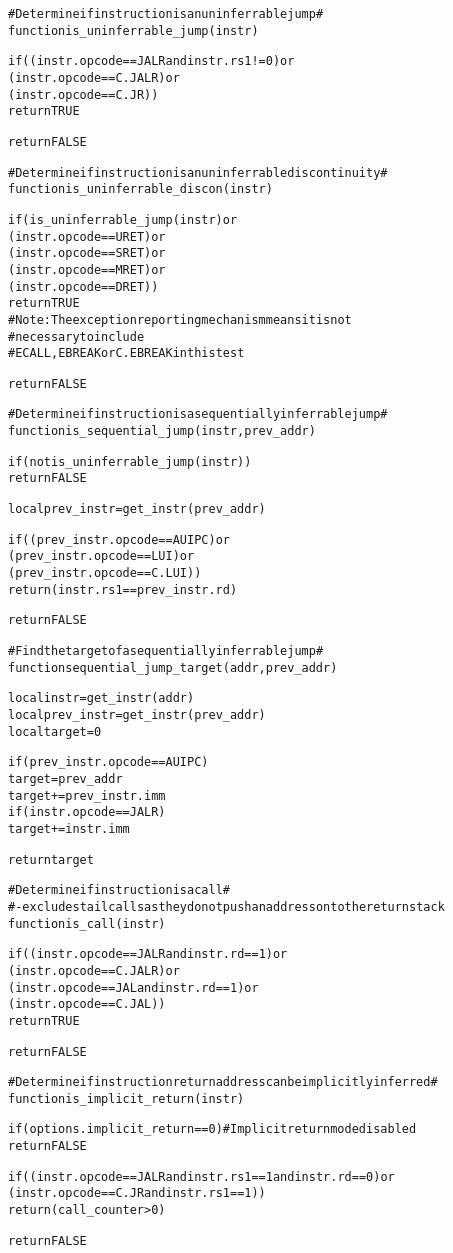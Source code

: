 \pagebreak

\begin{alltt}
# Determine if instruction is an uninferrable jump #
function is_uninferrable_jump (instr)

  if ((instr.opcode == JALR and instr.rs1 != 0) or
      (instr.opcode == C.JALR)                  or
      (instr.opcode == C.JR))
    return TRUE

  return FALSE

# Determine if instruction is an uninferrable discontinuity #
function is_uninferrable_discon (instr)

  if (is_uninferrable_jump(instr) or
      (instr.opcode == URET)      or
      (instr.opcode == SRET)      or
      (instr.opcode == MRET)      or
      (instr.opcode == DRET))
    return TRUE
    # Note: The exception reporting mechanism means it is not
    #   necessary to include
    # ECALL, EBREAK or C.EBREAK in this test

  return FALSE

# Determine if instruction is a sequentially inferrable jump #
function is_sequential_jump (instr, prev_addr)

  if (not is_uninferrable_jump(instr))
    return FALSE

  local prev_instr = get_instr(prev_addr)

  if((prev_instr.opcode == AUIPC) or
     (prev_instr.opcode == LUI)   or
     (prev_instr.opcode == C.LUI))
    return (instr.rs1 == prev_instr.rd)

  return FALSE
\end{alltt}

\pagebreak

\begin{alltt}
# Find the target of a sequentially inferrable jump #
function sequential_jump_target (addr, prev_addr)

  local instr      = get_instr(addr)
  local prev_instr = get_instr(prev_addr)
  local target     = 0

  if (prev_instr.opcode == AUIPC)
    target = prev_addr
  target += prev_instr.imm
  if (instr.opcode == JALR)
    target += instr.imm

  return target

# Determine if instruction is a call #
# - excludes tail calls as they do not push an address onto the return stack
function is_call (instr)

  if ((instr.opcode == JALR and instr.rd == 1) or
      (instr.opcode == C.JALR)                 or
      (instr.opcode == JAL  and instr.rd == 1) or
      (instr.opcode == C.JAL))
    return TRUE

  return FALSE

# Determine if instruction return address can be implicitly inferred #
function is_implicit_return (instr)

  if (options.implicit_return == 0) # Implicit return mode disabled
    return FALSE

  if ((instr.opcode == JALR and instr.rs1 == 1 and instr.rd == 0) or
      (instr.opcode == C.JR and instr.rs1 == 1))
    return (call_counter > 0)

  return FALSE
\end{alltt}


